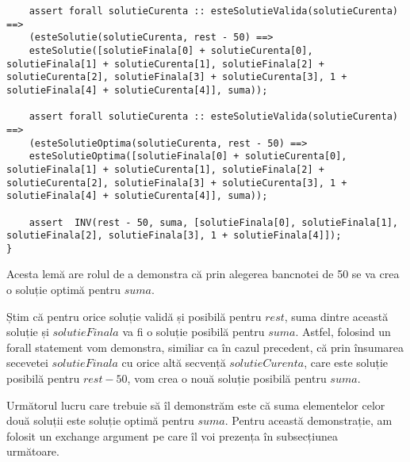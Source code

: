 \begin{enumerate}
\begin{lstlisting}
	assert forall solutieCurenta :: esteSolutieValida(solutieCurenta) ==>
	(esteSolutie(solutieCurenta, rest - 50) ==> 
	esteSolutie([solutieFinala[0] + solutieCurenta[0], solutieFinala[1] + solutieCurenta[1], solutieFinala[2] + solutieCurenta[2], solutieFinala[3] + solutieCurenta[3], 1 + solutieFinala[4] + solutieCurenta[4]], suma));
	
	assert forall solutieCurenta :: esteSolutieValida(solutieCurenta) ==>        
	(esteSolutieOptima(solutieCurenta, rest - 50) ==> 
	esteSolutieOptima([solutieFinala[0] + solutieCurenta[0], solutieFinala[1] + solutieCurenta[1], solutieFinala[2] + solutieCurenta[2], solutieFinala[3] + solutieCurenta[3], 1 + solutieFinala[4] + solutieCurenta[4]], suma));
	
	assert  INV(rest - 50, suma, [solutieFinala[0], solutieFinala[1], solutieFinala[2], solutieFinala[3], 1 + solutieFinala[4]]);
}
\end{lstlisting}
\par 
Acesta lemă are rolul de a demonstra că prin alegerea bancnotei de 50 se va crea o soluție optimă pentru $suma$.
\par 
Știm că pentru orice soluție validă și posibilă pentru $rest$, suma dintre această soluție și $solutieFinala$ va fi o soluție posibilă pentru $suma$. Astfel, folosind un forall statement vom demonstra, similiar ca în cazul precedent, că prin însumarea secevetei $solutieFinala$ cu orice altă secvență $solutieCurenta$, care este soluție posibilă pentru $rest-50$,  vom crea o nouă soluție posibilă pentru $suma$.
\par
Următorul lucru care trebuie să îl demonstrăm este că suma elementelor celor două soluții este soluție optimă pentru $suma$. Pentru această demonstrație, am folosit un exchange argument pe care îl voi prezența în subsecțiunea \\ următoare.



\end{enumerate}

